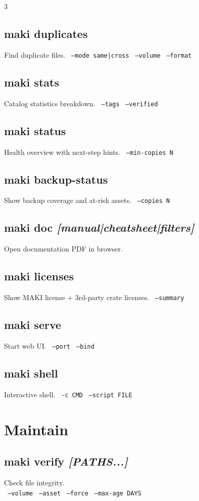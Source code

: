 \documentclass[a4paper,landscape,8pt]{article}
\newcommand{\opt}[1]{\texttt{\scriptsize\color{maki-stone} #1}}
\begin{document}
\begin{multicols}{3}
\subsection{maki duplicates}
Find duplicate files. \opt{--mode same|cross} \opt{--volume} \opt{--format}

\subsection{maki stats}
Catalog statistics breakdown. \opt{--tags} \opt{--verified}

\subsection{maki status}
Health overview with next-step hints. \opt{--min-copies N}

\subsection{maki backup-status}
Show backup coverage and at-risk assets. \opt{--copies N}

\subsection{maki doc \textit{[manual|cheatsheet|filters]}}
Open documentation PDF in browser.

\subsection{maki licenses}
Show MAKI license + 3rd-party crate licenses. \opt{--summary}

\subsection{maki serve}
Start web UI. \opt{--port} \opt{--bind}

\subsection{maki shell}
Interactive shell. \opt{-c CMD} \opt{--script FILE}

\section{Maintain}

\subsection{maki verify \textit{[PATHS...]}}
Check file integrity. \\
\opt{--volume} \opt{--asset} \opt{--force} \opt{--max-age DAYS}


\end{multicols}
\end{document}
